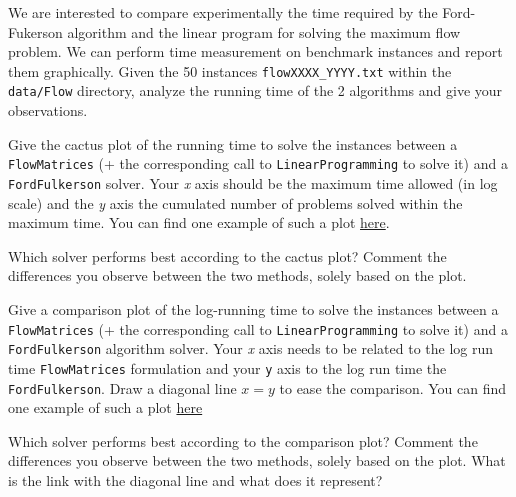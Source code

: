 \documentclass[12pt]{report}
\newcommand{\answerbox}[2]{\hfill\break\\
	\framebox[\linewidth]{\parbox[c][#1][c]{\dimexpr\linewidth-2\fboxsep-2\fboxrule}{#2}}
}
\begin{document}
	\begin{Exercise}[title={Experimental comparison LP vs Dedicated Algorithm}]

		We are interested to compare experimentally the time required by the Ford-Fukerson algorithm and the linear program for solving
		the maximum flow problem. We can perform time measurement on benchmark instances and report them graphically.
		Given the 50 instances \texttt{flowXXXX\_YYYY.txt} within the \texttt{data/Flow} directory, analyze the running time of the 2 algorithms and give your observations.


		\Question Give the cactus plot of the running time to solve the instances between a \texttt{FlowMatrices} (+ the corresponding call to \texttt{LinearProgramming} to solve it) and a \texttt{FordFulkerson} solver. Your \textit{x} axis should be the maximum time allowed (in log scale) and the \textit{y} axis the cumulated number of problems solved within the maximum time. You can find one example of such a plot \href{https://jeremiasberg.files.wordpress.com/2021/10/cactus_plot_side_v4.jpg?w=346&h=205}{here}.
		\answerbox{8cm}{
		}

		\Question Which solver performs best according to the cactus plot? Comment the differences you observe between the two methods, solely based on the plot.
		\answerbox{1.5cm}{
		}

		\pagebreak

		\Question Give a comparison plot of the log-running time to solve the instances between a \texttt{FlowMatrices} (+ the corresponding call to \texttt{LinearProgramming} to solve it) and a \texttt{FordFulkerson} algorithm solver. Your \textit{x} axis needs to be related to the log run time \texttt{FlowMatrices} formulation and your \texttt{y} axis to the log run time the \texttt{FordFulkerson}. Draw a diagonal line $x=y$ to ease the comparison. You can find one example of such a plot \href{https://www.researchgate.net/profile/Gael-Glorian/publication/335984300/figure/fig3/AS:827659797925888@1574340881515/Picasso-vs-gc-cdcl.png}{here}
		\answerbox{8cm}{
		}

		\Question Which solver performs best according to the comparison plot? Comment the differences you observe between the two methods, solely based on the plot. What is the link with the diagonal line and what does it represent?
		\answerbox{1.5cm}{
		}


	\end{Exercise}
\end{document}
